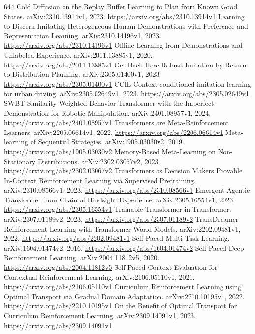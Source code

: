 \documentclass[11pt]{article}
\begin{document}
\begin{thebibliography}{644}
 Cold Diffusion on the Replay Buffer Learning to Plan from Known Good States. arXiv:2310.13914v1, 2023. \url{https://arxiv.org/abs/2310.13914v1}
 Learning to Discern Imitating Heterogeneous Human Demonstrations with Preference and Representation Learning. arXiv:2310.14196v1, 2023. \url{https://arxiv.org/abs/2310.14196v1}
 Offline Learning from Demonstrations and Unlabeled Experience. arXiv:2011.13885v1, 2020. \url{https://arxiv.org/abs/2011.13885v1}
 Get Back Here Robust Imitation by Return-to-Distribution Planning. arXiv:2305.01400v1, 2023. \url{https://arxiv.org/abs/2305.01400v1}
 CCIL Context-conditioned imitation learning for urban driving. arXiv:2305.02649v1, 2023. \url{https://arxiv.org/abs/2305.02649v1}
 SWBT Similarity Weighted Behavior Transformer with the Imperfect Demonstration for Robotic Manipulation. arXiv:2401.08957v1, 2024. \url{https://arxiv.org/abs/2401.08957v1}
 Transformers are Meta-Reinforcement Learners. arXiv:2206.06614v1, 2022. \url{https://arxiv.org/abs/2206.06614v1}
 Meta-learning of Sequential Strategies. arXiv:1905.03030v2, 2019. \url{https://arxiv.org/abs/1905.03030v2}
 Memory-Based Meta-Learning on Non-Stationary Distributions. arXiv:2302.03067v2, 2023. \url{https://arxiv.org/abs/2302.03067v2}
 Transformers as Decision Makers Provable In-Context Reinforcement Learning via Supervised Pretraining. arXiv:2310.08566v1, 2023. \url{https://arxiv.org/abs/2310.08566v1}
 Emergent Agentic Transformer from Chain of Hindsight Experience. arXiv:2305.16554v1, 2023. \url{https://arxiv.org/abs/2305.16554v1}
 Trainable Transformer in Transformer. arXiv:2307.01189v2, 2023. \url{https://arxiv.org/abs/2307.01189v2}
 TransDreamer Reinforcement Learning with Transformer World Models. arXiv:2202.09481v1, 2022. \url{https://arxiv.org/abs/2202.09481v1}
 Self-Paced Multi-Task Learning. arXiv:1604.01474v2, 2016. \url{https://arxiv.org/abs/1604.01474v2}
 Self-Paced Deep Reinforcement Learning. arXiv:2004.11812v5, 2020. \url{https://arxiv.org/abs/2004.11812v5}
 Self-Paced Context Evaluation for Contextual Reinforcement Learning. arXiv:2106.05110v1, 2021. \url{https://arxiv.org/abs/2106.05110v1}
 Curriculum Reinforcement Learning using Optimal Transport via Gradual Domain Adaptation. arXiv:2210.10195v1, 2022. \url{https://arxiv.org/abs/2210.10195v1}
 On the Benefit of Optimal Transport for Curriculum Reinforcement Learning. arXiv:2309.14091v1, 2023. \url{https://arxiv.org/abs/2309.14091v1}

\end{thebibliography}
\end{document}
